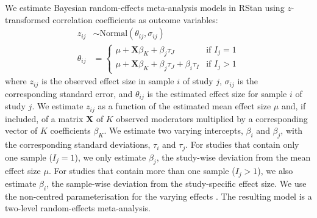 \documentclass[10pt, a4paper]{article}
\begin{document}
We estimate Bayesian random-effects meta-analysis models in RStan \cite{rstan_package} using $z$-transformed correlation coefficients as outcome variables:
\begin{align}
z_{ij} &\sim \text{Normal}(\theta_{ij}, \sigma_{ij}) \tag{Likelihood} \\
\theta_{ij} &= 
  \begin{cases} 
    \mu + \textbf{X}\beta_K + \beta_j\tau_J & \text{if } I_j = 1 \\
    \mu + \textbf{X}\beta_K + \beta_j\tau_J + \beta_i\tau_I & \text{if } I_j > 1 
  \end{cases} \tag{Regression}
\end{align}
where $z_{ij}$ is the observed effect size in sample $i$ of study $j$, $\sigma_{ij}$ is the corresponding standard error, and $\theta_{ij}$ is the estimated effect size for sample $i$ of study $j$. We estimate $z_{ij}$ as a function of the estimated mean effect size $\mu$ and, if included, of a matrix $\textbf{X}$ of $K$ observed moderators multiplied by a corresponding vector of $K$ coefficients $\beta_K$. We estimate two varying intercepts, $\beta_i$ and $\beta_j$, with the corresponding standard deviations, $\tau_i$ and $\tau_j$. For studies that contain only one sample ($I_j = 1$), we only estimate $\beta_j$, the study-wise deviation from the mean effect size $\mu$. For studies that contain more than one sample ($I_j > 1$), we also estimate $\beta_i$, the sample-wise deviation from the study-specific effect size. We use the non-centred parameterisation for the varying effects \cite{betancourt_hamilton_2015}. The resulting model is a two-level random-effects meta-analysis. 
\end{document}
